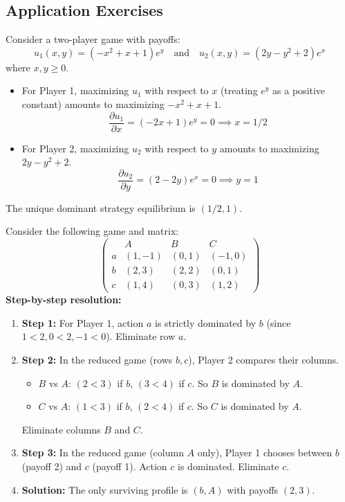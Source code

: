 \subsection{Application Exercises}

\begin{exemple}
Consider a two-player game with payoffs:
\[ u_1(x, y) = (-x^2 + x + 1)e^y \quad \text{and} \quad u_2(x, y) = (2y - y^2 + 2)e^x \]
where $x, y \ge 0$.
\begin{itemize}
    \item For Player 1, maximizing $u_1$ with respect to $x$ (treating $e^y$ as a positive constant) amounts to maximizing $-x^2 + x + 1$.
    \[ \frac{\partial u_1}{\partial x} = (-2x + 1)e^y = 0 \implies x = 1/2 \]
    \item For Player 2, maximizing $u_2$ with respect to $y$ amounts to maximizing $2y - y^2 + 2$.
    \[ \frac{\partial u_2}{\partial y} = (2 - 2y)e^x = 0 \implies y = 1 \]
\end{itemize}
The unique dominant strategy equilibrium is $(1/2, 1)$.
\end{exemple}

\begin{exemple}
Consider the following game and matrix:
\[
\begin{pmatrix} & A & B & C \\ a & (1,-1) & (0,1) & (-1,0) \\ b & (2,3) & (2,2) & (0,1) \\ c & (1,4) & (0,3) & (1,2) \end{pmatrix}
\]
\textbf{Step-by-step resolution:}
\begin{enumerate}
    \item \textbf{Step 1:} For Player 1, action $a$ is strictly dominated by $b$ (since $1<2, 0<2, -1<0$). Eliminate row $a$.
    \item \textbf{Step 2:} In the reduced game (rows $b, c$), Player 2 compares their columns.
    \begin{itemize}
        \item $B$ vs $A$: $(2 < 3)$ if $b$, $(3 < 4)$ if $c$. So $B$ is dominated by $A$.
        \item $C$ vs $A$: $(1 < 3)$ if $b$, $(2 < 4)$ if $c$. So $C$ is dominated by $A$.
    \end{itemize}
    Eliminate columns $B$ and $C$.
    \item \textbf{Step 3:} In the reduced game (column $A$ only), Player 1 chooses between $b$ (payoff 2) and $c$ (payoff 1). Action $c$ is dominated. Eliminate $c$.
    \item \textbf{Solution:} The only surviving profile is $(b, A)$ with payoffs $(2, 3)$.
\end{enumerate}
\end{exemple}

